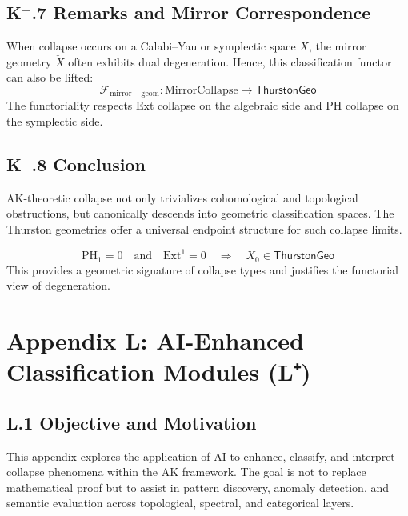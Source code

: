 \documentclass[11pt]{article}
\begin{document}
\begin{axiom}
\begin{axiom}
\subsection*{K$^+$.7 Remarks and Mirror Correspondence}

When collapse occurs on a Calabi–Yau or symplectic space \( X \), the mirror geometry \( \check{X} \) often  
exhibits dual degeneration. Hence, this classification functor can also be lifted:
\[
\mathcal{F}_{\mathrm{mirror-geom}} : \mathrm{MirrorCollapse} \to \mathsf{ThurstonGeo}
\]
The functoriality respects Ext collapse on the algebraic side and PH collapse on the symplectic side.

\subsection*{K$^+$.8 Conclusion}

AK-theoretic collapse not only trivializes cohomological and topological obstructions,  
but canonically descends into geometric classification spaces.  
The Thurston geometries offer a universal endpoint structure for such collapse limits.

\[
\boxed{
\mathrm{PH}_1 = 0 \quad \text{and} \quad \mathrm{Ext}^1 = 0 \quad \Rightarrow \quad X_0 \in \mathsf{ThurstonGeo}
}
\]
This provides a geometric signature of collapse types and justifies the functorial view of degeneration.





\section*{Appendix L: AI-Enhanced Classification Modules (L⁺)}

\subsection*{L.1 Objective and Motivation}

This appendix explores the application of AI to enhance, classify, and interpret collapse phenomena within the AK framework.  
The goal is not to replace mathematical proof but to assist in pattern discovery, anomaly detection, and semantic evaluation  
across topological, spectral, and categorical layers.


\end{axiom}
\end{axiom}
\end{document}
